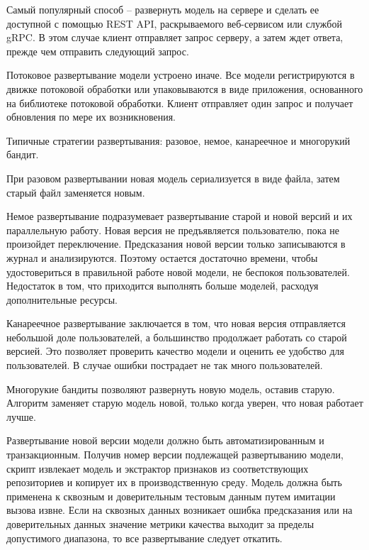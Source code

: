 {	\par \redline Самый популярный способ {--} развернуть модель на сервере и сделать ее доступной с помощью REST API, раскрываемого веб-сервисом или службой gRPC. В этом случае клиент отправляет запрос серверу, а затем ждет ответа, прежде чем отправить следующий запрос.

	\par \redline Потоковое развертывание модели устроено иначе. Все модели регистрируются в движке потоковой обработки или упаковываются в виде приложения, основанного на библиотеке потоковой обработки. Клиент отправляет один запрос и получает обновления по мере их возникновения.

	\par \redline Типичные стратегии развертывания: разовое, немое, канареечное и многорукий бандит.

	\par \redline При разовом развертывании новая модель сериализуется в виде файла, затем старый файл заменяется новым.

	\par \redline  Немое развертывание подразумевает развертывание старой и новой версий и их параллельную работу. Новая версия не предъявляется пользователю, пока не произойдет переключение. Предсказания новой версии только записываются в журнал и анализируются. Поэтому остается достаточно времени, чтобы удостовериться в правильной работе новой модели, не беспокоя пользователей. Недостаток в том, что приходится выполнять больше моделей, расходуя дополнительные ресурсы.

	\par \redline  Канареечное развертывание заключается в том, что новая версия отправляется небольшой доле пользователей, а большинство продолжает работать со старой версией. Это позволяет проверить качество модели и оценить ее удобство для пользователей. В случае ошибки пострадает не так много пользователей.

	\par \redline  Многорукие бандиты позволяют развернуть новую модель, оставив старую. Алгоритм заменяет старую модель новой, только когда уверен, что новая работает лучше.

	\par \redline Развертывание новой версии модели должно быть автоматизированным и транзакционным. Получив номер версии подлежащей развертыванию модели, скрипт извлекает модель и экстрактор признаков из соответствующих репозиториев и копирует их в производственную среду. Модель должна быть применена к сквозным и доверительным тестовым данным путем имитации вызова извне. Если на сквозных данных возникает ошибка предсказания или на доверительных данных значение метрики качества выходит за пределы допустимого диапазона, то все развертывание следует откатить.

}

